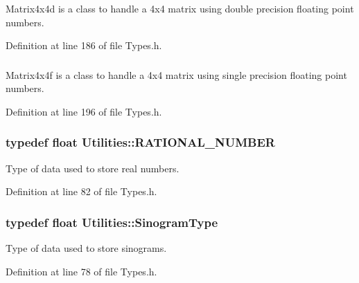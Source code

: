 Matrix4x4d is a class to handle a 4x4 matrix using double precision floating point numbers. 



Definition at line 186 of file Types.h.

\hypertarget{namespace_utilities_a468a3c0ce8ea13f2b50bbc872a7a4bb7}{
\subsubsection[{Matrix4x4f}]{}}
\label{namespace_utilities_a468a3c0ce8ea13f2b50bbc872a7a4bb7}


Matrix4x4f is a class to handle a 4x4 matrix using single precision floating point numbers. 



Definition at line 196 of file Types.h.

\hypertarget{namespace_utilities_a40969b96bd8d847b962e297cb79f08ce}{
\subsubsection[{RATIONAL\_\-NUMBER}]{\setlength{\rightskip}{0pt plus 5cm}typedef float {\bf Utilities::RATIONAL\_\-NUMBER}}}
\label{namespace_utilities_a40969b96bd8d847b962e297cb79f08ce}


Type of data used to store real numbers. 



Definition at line 82 of file Types.h.

\hypertarget{namespace_utilities_aec83622a80513f15f2bdee483a6af7a0}{
\subsubsection[{SinogramType}]{\setlength{\rightskip}{0pt plus 5cm}typedef float {\bf Utilities::SinogramType}}}
\label{namespace_utilities_aec83622a80513f15f2bdee483a6af7a0}


Type of data used to store sinograms. 



Definition at line 78 of file Types.h.

